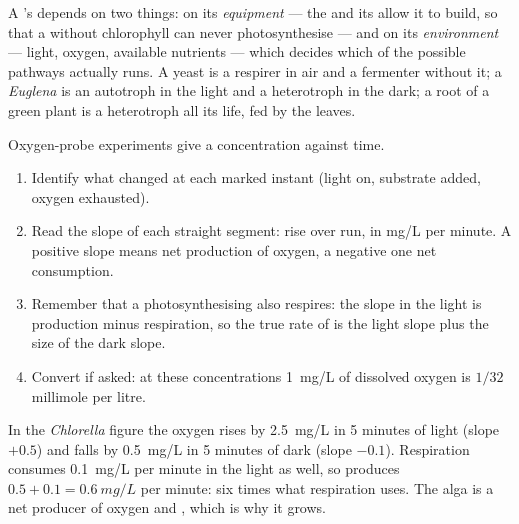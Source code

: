 \begin{proposition}\label{prop:g10:cell-metabolism:decides}
A 's  depends on two things: on its
\emph{equipment} --- the  and  its  allow it to
build, so that a  without chlorophyll can never photosynthesise
--- and on its \emph{environment} --- light, oxygen, available
nutrients --- which decides which of the possible pathways actually
runs. A yeast is a respirer in air and a fermenter without it; a
\emph{Euglena} is an autotroph in the light and a heterotroph in the
dark; a root  of a green plant is a heterotroph all its life, fed
by the leaves.
\end{proposition}
\admitted

\begin{method}\label{met:g10:cell-metabolism:trace}
Oxygen-probe experiments give a concentration against time.
\begin{enumerate}
  \item Identify what changed at each marked instant (light on,
        substrate added, oxygen exhausted).
  \item Read the slope of each straight segment: rise over run, in
        \unit{mg/L} per minute. A positive slope means net production
        of oxygen, a negative one net consumption.
  \item Remember that a photosynthesising  also respires: the slope
        in the light is production minus respiration, so the true rate
        of  is the light slope plus the size of the dark
        slope.
  \item Convert if asked: at these concentrations \qty{1}{mg/L} of
        dissolved oxygen is $1/32$ millimole per litre.
\end{enumerate}
\end{method}

\begin{example}\label{ex:g10:cell-metabolism:truerate}
In the \emph{Chlorella} figure the oxygen rises by \qty{2.5}{mg/L} in
5 minutes of light (slope $+0.5$) and falls by \qty{0.5}{mg/L} in 5
minutes of dark (slope $-0.1$). Respiration consumes \qty{0.1}{mg/L}
per minute in the light as well, so  produces
$0.5 + 0.1 = \qty{0.6}{mg/L}$ per minute: six times what respiration
uses. The alga is a net producer of oxygen and , which
is why it grows.
\end{example}

